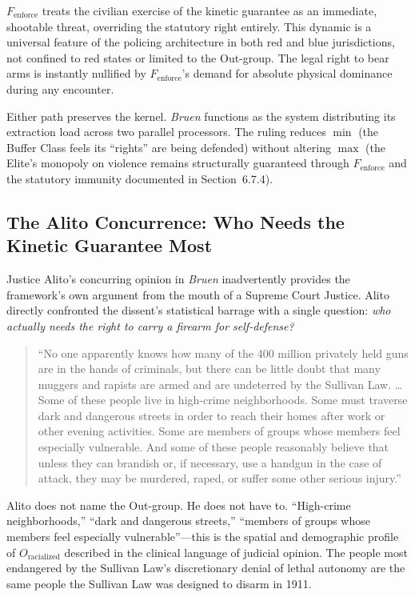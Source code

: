 \begin{itemize}
    $F_{\text{enforce}}$ treats the civilian exercise of the kinetic guarantee as an immediate, shootable threat, overriding the statutory right entirely. This dynamic is a universal feature of the policing architecture in both red and blue jurisdictions, not confined to red states or limited to the Out-group. The legal right to bear arms is instantly nullified by $F_{\text{enforce}}$'s demand for absolute physical dominance during any encounter.
\end{itemize}

Either path preserves the kernel. \textit{Bruen} functions as the system distributing its extraction load across two parallel processors. The ruling reduces $\min$ (the Buffer Class feels its ``rights'' are being defended) without altering $\max$ (the Elite's monopoly on violence remains structurally guaranteed through $F_{\text{enforce}}$ and the statutory immunity documented in Section~6.7.4).

\subsection{The Alito Concurrence: Who Needs the Kinetic Guarantee Most}

Justice Alito's concurring opinion in \textit{Bruen} inadvertently provides the framework's own argument from the mouth of a Supreme Court Justice. Alito directly confronted the dissent's statistical barrage with a single question: \textit{who actually needs the right to carry a firearm for self-defense?}

\begin{quote}
``No one apparently knows how many of the 400 million privately held guns are in the hands of criminals, but there can be little doubt that many muggers and rapists are armed and are undeterred by the Sullivan Law. \ldots Some of these people live in high-crime neighborhoods. Some must traverse dark and dangerous streets in order to reach their homes after work or other evening activities. Some are members of groups whose members feel especially vulnerable. And some of these people reasonably believe that unless they can brandish or, if necessary, use a handgun in the case of attack, they may be murdered, raped, or suffer some other serious injury.'' \cite{bruen}
\end{quote}

Alito does not name the Out-group. He does not have to. ``High-crime neighborhoods,'' ``dark and dangerous streets,'' ``members of groups whose members feel especially vulnerable''---this is the spatial and demographic profile of $O_{\text{racialized}}$ described in the clinical language of judicial opinion. The people most endangered by the Sullivan Law's discretionary denial of lethal autonomy are the same people the Sullivan Law was designed to disarm in 1911.

